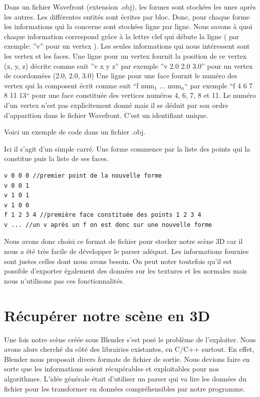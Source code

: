\documentclass[a4paper,12pt]{report}
\begin{document}
Dans un fichier Wavefront (extension .obj), les formes sont stockées les unes après les autres. Les différentes entités sont écrites par bloc.
Donc, pour chaque forme les informations qui la concerne sont stockées ligne par ligne. Nous savons à quoi chaque information correspond grâce à la lettre clef qui débute la ligne ( par exemple: ''v'' pour un vertex ).
Les seules informations qui nous intéressent sont les vertex et les faces. 
Une ligne pour un vertex fournit la position de ce vertex (x, y, z) décrite comme suit ''v x y z'' par exemple ''v 2.0 2.0 3.0'' pour un vertex de coordonnées (2.0, 2.0, 3.0)
Une ligne pour une face fournit le numéro des vertex qui la composent écrit comme suit ``f num$_{1}$ ... num$_{n}$`` par exemple ``f 4 6 7 8 11 13`` pour une face constituée des vertices numéros 4, 6, 7, 8 et 11. Le numéro d'un vertex n'est pas explicitement donné mais il se déduit par son ordre d'apparition dans le fichier Wavefront. C'est un identifiant unique.

Voici un exemple de code dans un fichier .obj.

Ici il s'agit d'un simple carré. Une forme commence par la liste des points qui la constitue puis la liste de ses faces.

\begin{verbatim}
v 0 0 0 //premier point de la nouvelle forme
v 0 0 1
v 1 0 1
v 1 0 0
f 1 2 3 4 //première face constituée des points 1 2 3 4
v ... //un v après un f on est donc sur une nouvelle forme
\end{verbatim}

Nous avons donc choisi ce format de fichier pour stocker notre scène 3D car il nous a été très facile de développer le parser adéquat. Les informations fournies sont justes celles dont nous avons besoin. On peut noter toutefois qu'il est possible d'exporter également des données sur les textures et les normales mais nous n'utilisons pas ces fonctionnalités.

\section{Récupérer notre scène en 3D}
 
Une fois notre scène créée sous Blender s'est posé le problème de l'exploiter. Nous avons alors cherché du côté des librairies existantes, en C/C++ surtout. En effet, Blender nous proposait divers formats de fichier de sortie. Nous devions faire en sorte que les informations soient récupérables et exploitables pour nos algorithmes. L'idée générale était d'utiliser un parser qui va lire les données du fichier pour les transformer en données compréhensibles par notre programme.
\end{document}
